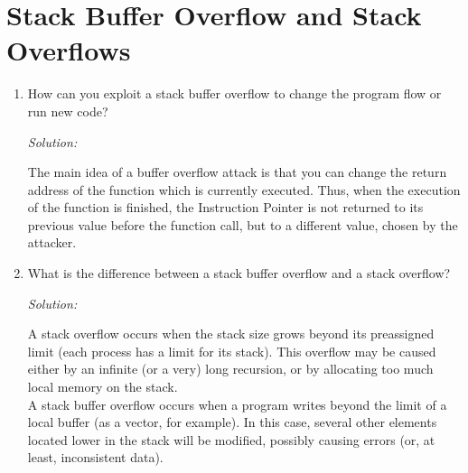 \documentclass[a4paper,11pt]{article}
\newenvironment{solution}%
{\par{\noindent\small\textit{Solution:}}\vspace{-12pt}\begin{framed}}%
{\end{framed}\par}
\begin{document}
\section*{Stack Buffer Overflow and Stack Overflows}
\begin{enumerate}
\item How can you exploit a stack buffer overflow to change the program flow or
run new code?  
\ifsolution
\begin{solution}
The main idea of a buffer overflow attack is that you can change the return address
of the function which is currently executed. Thus, when the execution of the function
is finished, the Instruction Pointer is not returned to its previous value before the
function call, but to a different value, chosen by the attacker.
\end{solution}\fi


\item What is the difference between a stack buffer overflow and a stack
  overflow?
\ifsolution\begin{solution}
A stack overflow occurs when the stack size grows beyond its preassigned limit (each
process has a limit for its stack). This overflow may be caused either by an infinite (or a very)
long recursion, or by allocating too much local memory on the stack.\\
A stack buffer overflow occurs when a program writes beyond the limit of a local buffer (as a vector,
for example). In this case, several other elements located lower in the stack will be modified,
possibly causing errors (or, at least, inconsistent data).
\end{solution}\fi 
\end{enumerate}
\end{document}
